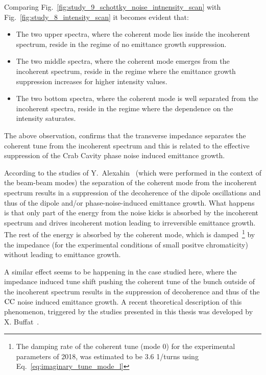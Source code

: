 Comparing Fig.~\ref{fig:study_9_schottky_noise_intnensity_scan} with Fig.~\ref{fig:study_8_intensity_scan} it becomes evident that:
\begin{itemize}
    \item The two upper spectra, where the coherent mode lies inside the incoherent spectrum, reside in the regime of no emittance growth suppression.
    \item The two middle spectra, where the coherent mode emerges from the incoherent spectrum, reside in the regime where the emittance growth suppression increases for higher intensity values.
    \item The two bottom spectra, where the coherent mode is well separated from the incoherent spectra, reside in the regime where the dependence on the intensity saturates.
\end{itemize}

The above observation, confirms that the transverse impedance separates the coherent tune from the incoherent spectrum and this is related to the effective suppression of the Crab Cavity phase noise induced emittance growth.

According to the studies of Y.~Alexahin~\cite{Alexahin:314169} (which were performed in the context of the beam-beam modes) the separation of the coherent mode from the incoherent spectrum results in a suppression of the decoherence of the dipole oscillations and thus of the dipole and/or phase-noise-induced emittance growth. What happens is that only part of the energy from the noise kicks is absorbed by the incoherent spectrum and drives incoherent motion leading to irreversible emittance growth. The rest of the energy is absorbed by the coherent mode, which is damped~\footnote{The damping rate of the coherent tune (mode 0) for the experimental parameters of 2018, was estimated to be 3.6 1/turns using Eq.~\eqref{eq:imaginary_tune_mode_l}} by the impedance (for the experimental conditions of small positve chromaticity) without leading to emittance growth.

A similar effect seems to be happening in the case studied here, where the impedance induced tune shift pushing the coherent tune of the bunch outside of the incoherent spectrum results in the suppression of decoherence and thus of the ${\mathrm{CC}}$ noise induced emittance growth. A recent theoretical description of this phenomenon, triggered by the studies presented in this thesis was developed by X. Buffat~\cite{Buffat:2022dac, van_kamper_presentation_xavier_theory}.


